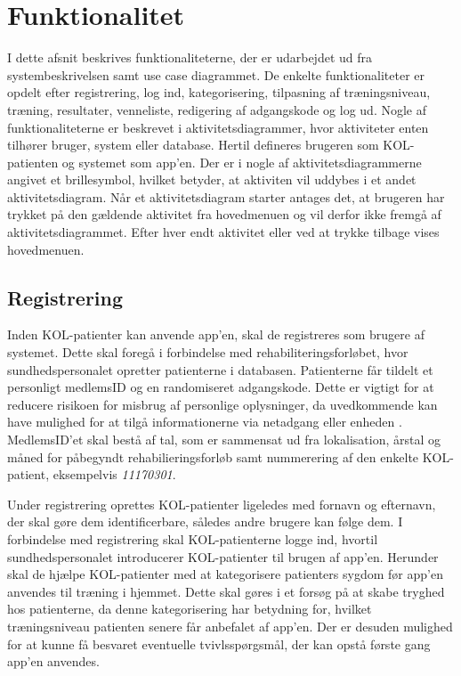 \section{Funktionalitet}
I dette afsnit beskrives funktionaliteterne, der er udarbejdet ud fra systembeskrivelsen samt use case diagrammet. De enkelte funktionaliteter er opdelt efter registrering, log ind, kategorisering, tilpasning af træningsniveau, træning, resultater, venneliste, redigering af adgangskode og log ud. Nogle af funktionaliteterne er beskrevet i aktivitetsdiagrammer, hvor aktiviteter enten tilhører bruger, system eller database. Hertil defineres brugeren som KOL-patienten og systemet som app'en. Der er i nogle af aktivitetsdiagrammerne angivet et brillesymbol, hvilket betyder, at aktiviten vil uddybes i et andet aktivitetsdiagram. Når et aktivitetsdiagram starter antages det, at brugeren har trykket på den gældende aktivitet fra hovedmenuen og vil derfor ikke fremgå af aktivitetsdiagrammet. Efter hver endt aktivitet eller ved at trykke tilbage vises hovedmenuen. 

\subsection*{Registrering} \label{sec:registrering}
Inden KOL-patienter kan anvende app'en, skal de registreres som brugere af systemet. Dette skal foregå i forbindelse med rehabiliteringsforløbet, hvor sundhedspersonalet opretter patienterne i databasen. Patienterne får tildelt et personligt medlemsID og en randomiseret adgangskode. Dette er vigtigt for at reducere risikoen for misbrug af personlige oplysninger, da uvedkommende kan have mulighed for at tilgå informationerne via netadgang eller enheden \cite{Sundhedsdatastyrelsen2016}. MedlemsID'et skal bestå af tal, som er sammensat ud fra lokalisation, årstal og måned for påbegyndt rehabilieringsforløb samt nummerering af den enkelte KOL-patient, eksempelvis \textit{11170301}.

Under registrering oprettes KOL-patienter ligeledes med fornavn og efternavn, der skal gøre dem identificerbare, således andre brugere kan følge dem. I forbindelse med registrering skal KOL-patienterne logge ind, hvortil sundhedspersonalet introducerer KOL-patienter til brugen af app'en. Herunder skal de hjælpe KOL-patienter med at kategorisere patienters sygdom før app'en anvendes til træning i hjemmet. Dette skal gøres i et forsøg på at skabe tryghed hos patienterne, da denne kategorisering har betydning for, hvilket træningsniveau patienten senere får anbefalet af app'en. Der er desuden mulighed for at kunne få besvaret eventuelle tvivlsspørgsmål, der kan opstå første gang app'en anvendes. 


